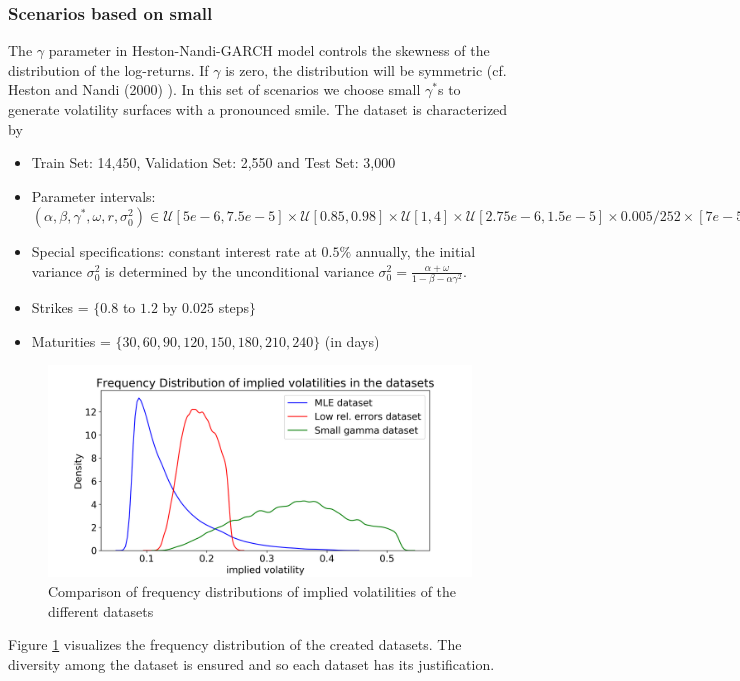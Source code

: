 \documentclass{article}
\begin{document}
\subsubsection{Scenarios based on small \boldmath{$\gamma^*$}}
\label{sec:setupsmallg}
The $\gamma$ parameter in Heston-Nandi-GARCH model controls the skewness of the distribution of the log-returns. If $\gamma$ is zero, the distribution will be symmetric (cf. Heston and Nandi (2000) \cite{HestonNandi}). In this set of scenarios we choose small $\gamma^*$s to generate volatility surfaces with a pronounced smile. The dataset is characterized by 
\begin{itemize}
    \item Train Set: 14,450, Validation Set: 2,550 and Test Set: 3,000
    \item Parameter intervals: $(\alpha, \beta, \gamma^*, \omega, r ,\sigma_0^2) \in \mathcal{U}[5e-6, 7.5e-5] \times \mathcal{U}[0.85, 0.98] \times \mathcal{U}[1, 4] \times \mathcal{U}[2.75e-6, 1.5e-5] \times 0.005/252 \times [7e-5, 0.001]$
    \item Special specifications: constant interest rate at $0.5\%$ annually, the initial variance $\sigma_0^2$ is determined by the unconditional variance  $\sigma_0^2 = \frac{\alpha+\omega}{1-\beta-\alpha\gamma^2}$.
    \item Strikes = $\{0.8$ to $1.2$ by $0.025$ steps$\}$
    \item Maturities = $\{30, 60, 90, 120, 150, 180, 210, 240\}$ (in days)
\end{itemize}
\begin{figure}[!ht]
\centering
\includegraphics[width=.8\textwidth]{Distribution_Vola_datsets.png}
\caption{Comparison of frequency distributions of implied volatilities of the different datasets}
\label{fig:vol_dist}
\end{figure}
Figure \ref{fig:vol_dist} visualizes the frequency distribution of the created datasets. The diversity among the dataset is ensured and so each dataset has its justification. 
\end{document}
